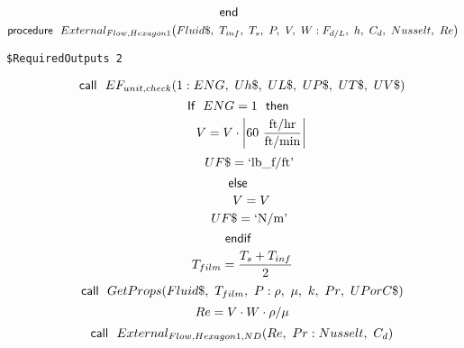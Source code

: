 \documentclass[10pt,fleqn]{article}
\newcommand{\F}[1]{\mbox{$#1$}}
\newcommand{\K}[1]{\mbox{\sf#1\ \ \mit}}
\newcommand{\KS}[1]{\mbox{\sf\ \ #1\ \ \mit}}
\newcommand{\SC}[1]{\mbox{`#1'}\  }
\newcommand{\V}[1]{\mbox{$ #1 $}}
\newcommand{\I}{\mbox{\hspace{0.20in}}}
\begin{document}
\begin{equation}
\label{EES Eqn:354}
\K{end} 
\end{equation}
\vspace{0.1 in}
\begin{equation}
\label{EES Eqn:355}
\K{procedure} \F{External_{Flow,Hexagon1}}{ \left( Fluid\$,\ T_{inf},\ T_{s},\  P,\ V,\ W: F_{d/L},\ h,\ C_{d},\ \V{Nusselt} ,\ \V{Re}  \right) } 
\end{equation}
\begin{verbatim}
$RequiredOutputs 2
\end{verbatim}  \begin{equation}
\I \label{EES Eqn:356}
\K{call} \F{EF_{unit,check}}{ \left( 1:\V{ENG} ,\ Uh\$,\ UL\$,\ UP\$,\ UT\$,\ UV\$ \right) } 
\end{equation}
\begin{equation}
\I \label{EES Eqn:357}
\K{If} \V{ENG} =1 \KS{then} 
\end{equation}
\begin{equation}
\I \I \label{EES Eqn:358}
V=V\cdot \rm { \left|60\ \frac {\rm{ft/hr}}{\rm{ft/min}}\right|} 
\end{equation}
\begin{equation}
\I \I \label{EES Eqn:359}
UF\$=\SC{lb\_f/ft} 
\end{equation}
\begin{equation}
\I \label{EES Eqn:360}
\K{else} 
\end{equation}
\begin{equation}
\I \I \label{EES Eqn:361}
V=V 
\end{equation}
\begin{equation}
\I \I \label{EES Eqn:362}
UF\$=\SC{N/m} 
\end{equation}
\begin{equation}
\I \label{EES Eqn:363}
\K{endif} 
\end{equation}
\begin{equation}
\I \label{EES Eqn:364}
T_{film}=\frac {T_{s}+T_{inf}}{ 2 } 
\end{equation}
\begin{equation}
\I \label{EES Eqn:365}
\K{call} \F{GetProps}{ \left( Fluid\$,\ T_{film},\ P: \rho,\ \mu,\ k,\ \V{Pr} ,\ UPorC\$ \right) } 
\end{equation}
\begin{equation}
\I \label{EES Eqn:366}
\V{Re} =V\cdot W\cdot \rho/\mu 
\end{equation}
\begin{equation}
\I \label{EES Eqn:367}
\K{call} \F{External_{Flow,Hexagon1,ND}}{ \left( \V{Re} ,\ \V{Pr} :\V{Nusselt} ,\ C_{d} \right) } 
\end{equation}
\end{document}
